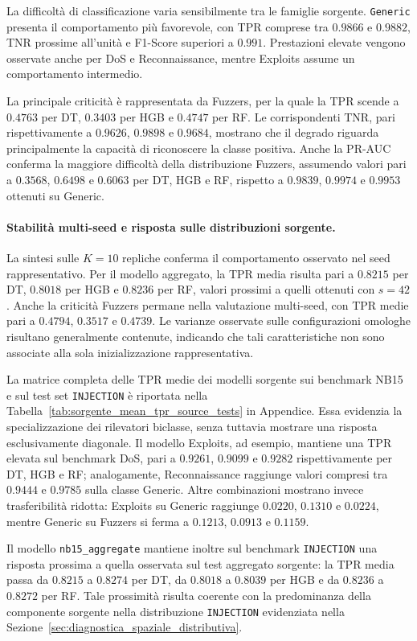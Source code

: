 La difficoltà di classificazione varia sensibilmente tra le famiglie sorgente. 
\texttt{Generic} presenta il comportamento più favorevole, con TPR comprese tra $0.9866$ e $0.9882$, TNR prossime all'unità e F1-Score superiori a $0.991$. 
Prestazioni elevate vengono osservate anche per DoS e Reconnaissance, mentre Exploits assume un comportamento intermedio.

La principale criticità è rappresentata da Fuzzers, per la quale la TPR scende a $0.4763$ per DT, $0.3403$ per HGB e $0.4747$ per RF. 
Le corrispondenti TNR, pari rispettivamente a $0.9626$, $0.9898$ e $0.9684$, mostrano che il degrado riguarda principalmente la capacità di riconoscere la classe positiva. 
Anche la PR-AUC conferma la maggiore difficoltà della distribuzione Fuzzers, assumendo valori pari a $0.3568$, $0.6498$ e $0.6063$ per DT, HGB e RF, rispetto a $0.9839$, $0.9974$ e $0.9953$ ottenuti su Generic.

\paragraph{Stabilità multi-seed e risposta sulle distribuzioni sorgente.}
La sintesi sulle $K=10$ repliche conferma il comportamento osservato nel seed rappresentativo. 
Per il modello aggregato, la TPR media risulta pari a $0.8215$ per DT, $0.8018$ per HGB e $0.8236$ per RF, valori prossimi a quelli ottenuti con $s=42$. 
Anche la criticità Fuzzers permane nella valutazione multi-seed, con TPR medie pari a $0.4794$, $0.3517$ e $0.4739$.
Le varianze osservate sulle configurazioni omologhe risultano generalmente contenute, indicando che tali caratteristiche non sono associate alla sola inizializzazione rappresentativa.

La matrice completa delle TPR medie dei modelli sorgente sui benchmark NB15 e sul test set \texttt{INJECTION} è riportata nella Tabella~\ref{tab:sorgente_mean_tpr_source_tests} in Appendice. 
Essa evidenzia la specializzazione dei rilevatori biclasse, senza tuttavia mostrare una risposta esclusivamente diagonale. 
Il modello Exploits, ad esempio, mantiene una TPR elevata sul benchmark DoS, pari a $0.9261$, $0.9099$ e $0.9282$ rispettivamente per DT, HGB e RF; analogamente, Reconnaissance raggiunge valori compresi tra $0.9444$ e $0.9785$ sulla classe Generic. 
Altre combinazioni mostrano invece trasferibilità ridotta: Exploits su Generic raggiunge $0.0220$, $0.1310$ e $0.0224$, mentre Generic su Fuzzers si ferma a $0.1213$, $0.0913$ e $0.1159$.

Il modello \texttt{nb15\_aggregate} mantiene inoltre sul benchmark \texttt{INJECTION} una risposta prossima a quella osservata sul test aggregato sorgente: la TPR media passa da $0.8215$ a $0.8274$ per DT, da $0.8018$ a $0.8039$ per HGB e da $0.8236$ a $0.8272$ per RF. 
Tale prossimità risulta coerente con la predominanza della componente sorgente nella distribuzione \texttt{INJECTION} evidenziata nella Sezione~\ref{sec:diagnostica_spaziale_distributiva}.

